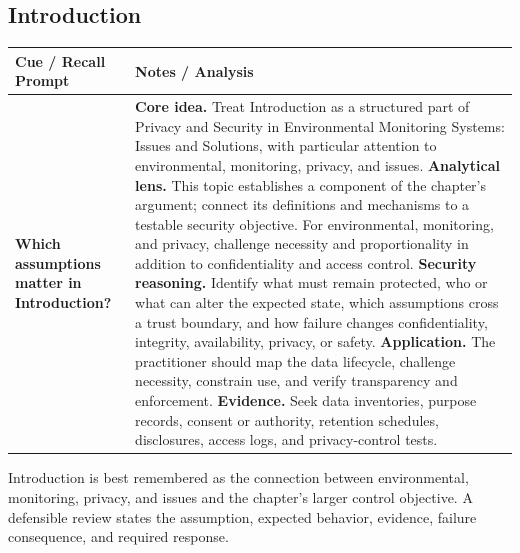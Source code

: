 \documentclass[11pt]{article}
\newcommand{\CornellHeader}{%
\rowcolor{Navy}\color{white}\bfseries Cue / Recall Prompt & \color{white}\bfseries Notes / Analysis\\\hline}
\newcommand{\CornellRow}[2]{%
\cellcolor{CueGray}\RaggedRight\textbf{#1} & \RaggedRight #2\\\hline}
\begin{document}
\subsection*{Introduction}
\begin{longtable}{>{\RaggedRight\arraybackslash}p{}|>{\RaggedRight\arraybackslash}p{}}
\CornellHeader
\CornellRow{Which assumptions matter in Introduction?}{\textbf{Core idea.} Treat Introduction as a structured part of Privacy and Security in Environmental Monitoring Systems: Issues and Solutions, with particular attention to environmental, monitoring, privacy, and issues. \textbf{Analytical lens.} This topic establishes a component of the chapter's argument; connect its definitions and mechanisms to a testable security objective. For environmental, monitoring, and privacy, challenge necessity and proportionality in addition to confidentiality and access control. \textbf{Security reasoning.} Identify what must remain protected, who or what can alter the expected state, which assumptions cross a trust boundary, and how failure changes confidentiality, integrity, availability, privacy, or safety. \textbf{Application.} The practitioner should map the data lifecycle, challenge necessity, constrain use, and verify transparency and enforcement. \textbf{Evidence.} Seek data inventories, purpose records, consent or authority, retention schedules, disclosures, access logs, and privacy-control tests.}
\end{longtable}
\begin{topicsummary}
Introduction is best remembered as the connection between environmental, monitoring, privacy, and issues and the chapter's larger control objective. A defensible review states the assumption, expected behavior, evidence, failure consequence, and required response.
\end{topicsummary}
\end{document}
